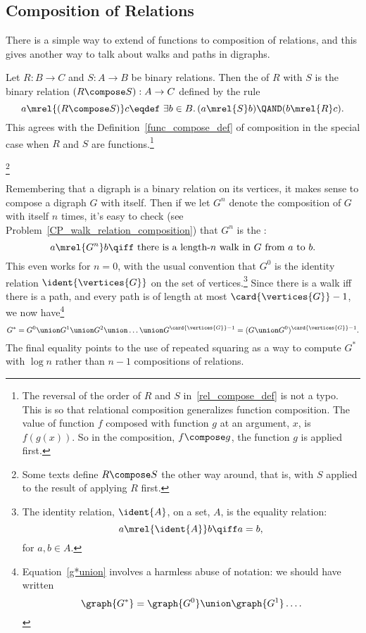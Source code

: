 \subsection{Composition of Relations}\label{relation_compose_subsec}
There is a simple way to extend  of functions to
composition of relations, and this gives another way to talk about
walks and paths in digraphs.

\begin{definition}
Let $R: B\to C$ and $S: A \to B$ be binary relations.  Then the
 of $R$ with $S$ is the binary relation $(R \compose
S): A\to C$ defined by the rule
\begin{equation}\label{rel_compose_def}
a \mrel{(R \compose S)} c \eqdef\ \exists b \in B.\, (a \mrel{S} b)
\QAND (b \mrel{R} c).
\end{equation}
This agrees with the Definition~\ref{func_compose_def} of composition
in the special case when $R$ and $S$ are functions.\footnote{The
  reversal of the order of $R$ and $S$ in~\eqref{rel_compose_def} is
  not a typo.  This is so that relational composition generalizes
  function composition.  The value of function $f$ composed with
  function $g$ at an argument, $x$, is $f(g(x))$.  So in the
  composition, $f \compose g$, the function $g$ is applied first.}
\end{definition}

\begin{editingnotes}

\footnote{Some texts define $R \compose S$ the other way around, that
  is, with $S$ applied to the result of applying $R$ first.}

\end{editingnotes}

Remembering that a digraph is a binary relation on its vertices, it
makes sense to compose a digraph $G$ with itself.  Then if we let
$G^n$ denote the composition of $G$ with itself $n$ times, it's easy
to check (see Problem~\ref{CP_walk_relation_composition}) that $G^n$
is the :
\[
a  \mrel{G^n} b \qiff \mbox{ there is a length-$n$ walk in $G$ from $a$ to $b$}.
\]
This even works for $n=0$, with the usual convention that $G^0$ is the
identity relation $\ident{\vertices{G}}$ on the set of
vertices.\footnote{The identity relation, $\ident{A}$, on a set, $A$,
  is the equality relation:
\[
a \mrel{\ident{A}} b \qiff a  = b,
\]
for $a,b \in A$.}  Since there is a walk iff there is a path,
and every path is of length at most $\card{\vertices{G}}-1$, 
we now have\footnote{Equation~\eqref{g*union} involves a harmless
  abuse of notation: we should have written
\[
\graph{G^*} = \graph{G^0} \union \graph{G^1} \dots.
\]
}
\begin{equation}\label{g*union}
G^* = G^0 \union G^1 \union G^2 \union \dots \union
G^{\card{\vertices{G}}-1} = (G \union G^0)^{\card{\vertices{G}}-1}.
\end{equation}
The final equality points to the use of repeated squaring as a way to
compute $G^*$ with $\log n$ rather than $n-1$ compositions of
relations.

